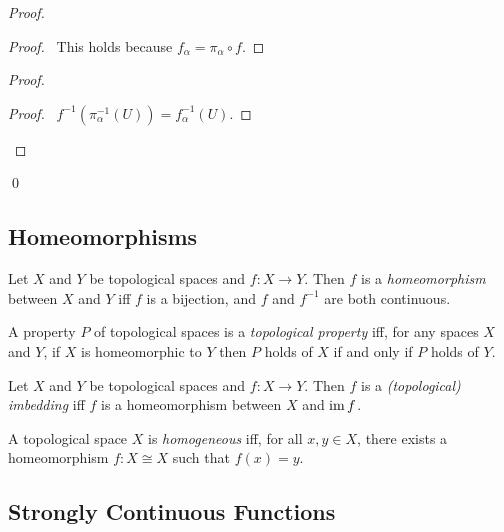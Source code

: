 \begin{proof}
  \pf
  \begin{proof}
    \pf\ This holds because $f_\alpha = \pi_\alpha \circ f$.
  \end{proof}
  \begin{proof}
    \begin{proof}
      \pf\ $f^{-1}(\pi_\alpha^{-1}(U)) = f_\alpha^{-1}(U)$.
    \end{proof}
  \end{proof}
  \qed
\end{proof}



\subsection{Homeomorphisms}

\begin{df}[Homeomorphism]
  Let $X$ and $Y$ be topological spaces and $f : X \rightarrow Y$. Then $f$
  is
  a
  \emph{homeomorphism} between $X$ and $Y$ iff $f$ is a bijection, and $f$
  and
  $f^{-1}$ are both continuous.
\end{df}

\begin{df}
  A property $P$ of topological spaces is a \emph{topological property} iff,
  for any spaces $X$ and $Y$, if $X$ is homeomorphic to $Y$ then $P$ holds of
  $X$
  if and only if $P$ holds of $Y$.
\end{df}

\begin{df}
  Let $X$ and $Y$ be topological spaces and $f : X \rightarrow Y$. Then $f$
  is
  a
  \emph{(topological) imbedding} iff $f$ is a homeomorphism between $X$ and
  $\operatorname{im} f$.
\end{df}

\begin{df}[Homogeneous]
  A topological space $X$ is \emph{homogeneous} iff, for all $x, y \in X$,
  there exists a homeomorphism $f : X \cong X$ such that $f(x) = y$.
\end{df}


\subsection{Strongly Continuous Functions}

